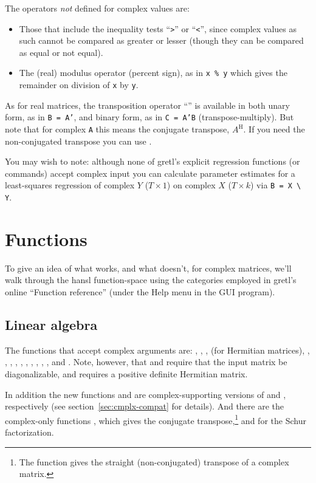 The operators \textit{not} defined for complex values are:
\begin{itemize}
\item Those that include the inequality tests ``\verb+>+'' or
  ``\verb+<+'', since complex values as such cannot be compared as
  greater or lesser (though they can be compared as equal or not
  equal).
\item The (real) modulus operator (percent sign), as in \texttt{x \%
    y} which gives the remainder on division of \texttt{x} by
  \texttt{y}.
\end{itemize}

As for real matrices, the transposition operator ``'' is
available in both unary form, as in \texttt{B = A'}, and binary form,
as in \texttt{C = A'B} (transpose-multiply). But note that for complex
\texttt{A} this means the conjugate transpose, $A^\mathrm{H}$. If you
need the non-conjugated transpose you can use .

You may wish to note: although none of gretl's explicit regression
functions (or commands) accept complex input you can calculate
parameter estimates for a least-squares regression of complex $Y$
($T \times 1$) on complex $X$ ($T \times k$) via \verb|B = X \ Y|.

\section{Functions}
\label{sec:cmplx-funcs}

To give an idea of what works, and what doesn't, for complex
matrices, we'll walk through the hansl function-space using the
categories employed in gretl's online ``Function reference'' (under the
\textsf{Help} menu in the GUI program).

\subsection{Linear algebra}

The functions that accept complex arguments are: ,
, ,  (for Hermitian matrices),
, , , , ,
, , , , , and
. Note, however, that  and  require
that the input matrix be diagonalizable, and  requires a
positive definite Hermitian matrix.

In addition the new functions  and  are
complex-supporting versions of  and ,
respectively (see section~\ref{sec:cmplx-compat} for details). And
there are the complex-only functions , which gives the
conjugate transpose,\footnote{The  function gives the
  straight (non-conjugated) transpose of a complex matrix.} and
 for the Schur factorization.

